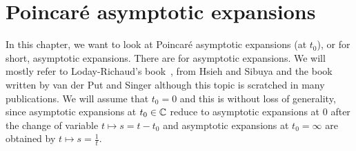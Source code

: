 \chapter{Poincaré asymptotic expansions}
\begin{comment}
  \begin{multicols}{2}
    ´classical'
    \begin{itemize}
      \item \cite[60]{sabbah_cimpa90} Chapter II.2.2
        \begin{itemize}
          \item \cite{sabbah2000equations}
        \end{itemize}
      \item \textbf{\textcolor{blue}{Van der Put:
        \cite[Chapter 7]{van2003galois}: Exact Asymptotics}}
      \item \cite{majima1984asymptotic}
      \item \cite[Sec.4.4]{Balser2000Formal}
      \item \cite{Loday1994}
      \item \textbf{\textcolor{blue}{\cite{Loday2014} Chapter 2}}
      \item \cite{hsieh2012basic}
    \end{itemize}
    \columnbreak
    ´sheafical'
    \begin{itemize}
      \item \textbf{\textcolor{red}{\cite[II.5]{sabbah2007isomonodromic}}}
    \end{itemize}
  \end{multicols}
  \TODO[\cite{sibuya1990Linear} Appendix A.3]
\end{comment}
In this chapter, we want to look at Poincaré asymptotic expansions (at $t_0$),
or for short, asymptotic expansions.
There are  for asymptotic expansions.
We will mostly refer to Loday-Richaud's book~\cite[chapter 2]{Loday2014},
\cite[XI-1-13]{hsieh2012basic} from Hsieh and Sibuya and the
book~\cite[chapter 7]{van2003galois} written by van der Put and Singer although
this topic is scratched in many publications.
We will assume that $t_0=0$ and this is without loss of generality, since
asymptotic expansions at $t_0\in\mathbb{C}$ reduce to asymptotic expansions at $0$
after the change of variable $t\mapsto s=t-t_0$ and asymptotic expansions at
$t_0=\infty$ are obtained by $t\mapsto s=\frac{1}{t}$.

